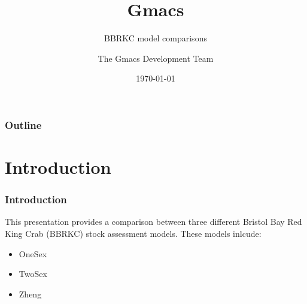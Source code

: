 \documentclass{beamer}
\title{Gmacs}
\subtitle{BBRKC model comparisons}
\author{The Gmacs Development Team}
\date{\today}
\begin{document}

\begin{frame}
\titlepage
\end{frame}


\begin{frame}
\frametitle{Outline}
\tableofcontents
\end{frame}


\section{Introduction}


\begin{frame}
\frametitle{Introduction}
This presentation provides a comparison between three different Bristol Bay Red
King Crab (BBRKC) stock assessment models. These models inlcude:
\begin{itemize}
\item OneSex
\item TwoSex
\item Zheng
\end{itemize}
\end{frame}

\end{document}
